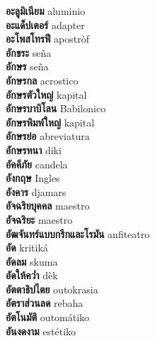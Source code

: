 \textbf{ อะลูมิเนียม  } aluminio \\
\textbf{ อะแด็ปเตอร์  } adapter \\
\textbf{ อะโพสโทรฟี  } apostròf \\
\textbf{ อักขระ  } seña \\
\textbf{ อักษร  } seña \\
\textbf{ อักษรกล  } acrostico \\
\textbf{ อักษรตัวใหญ่  } kapital \\
\textbf{ อักษรบาบิโลน  } Babilonico \\
\textbf{ อักษรพิมพ์ใหญ่  } kapital \\
\textbf{ อักษรย่อ  } abreviatura \\
\textbf{ อักษรหนา  } diki \\
\textbf{ อัคคีภัย  } candela \\
\textbf{ อังกฤษ  } Ingles \\
\textbf{ อังคาร  } djamars \\
\textbf{ อัจฉริยบุคคล  } maestro \\
\textbf{ อัจฉริยะ  } maestro \\
\textbf{ อัฒจันทร์แบบกรีกและโรมัน  } anfiteatro \\
\textbf{ อัด  } kritiká \\
\textbf{ อัดลม  } skuma \\
\textbf{ อัดให้คว่ำ  } dèk \\
\textbf{ อัตตาธิปไตย  } outokrasia \\
\textbf{ อัตราส่วนลด  } rebaha \\
\textbf{ อัตโนมัติ  } outomátiko \\
\textbf{ อันงดงาม  } estétiko \\
